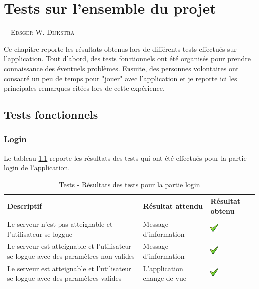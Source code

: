 

\chapter{Tests sur l'ensemble du projet}
\label{testensembleprojet}
\begin{epigraphs}
%
{---\textsc{Edsger W. Dijkstra}}
\end{epigraphs}

Ce chapitre reporte les résultats obtenus lors de différents tests effectués sur l'application. Tout d'abord, des tests fonctionnels ont été organisés pour prendre connaissance des éventuels problèmes. Ensuite, des personnes volontaires ont consacré un peu de temps pour "jouer" avec l'application et je reporte ici les principales remarques citées lors de cette expérience.

\section{Tests fonctionnels} %
\label{sec:tests_fonctionnels}

\subsection{Login} %
\label{sub:login}
Le tableau \ref{tab:testLogin} reporte les résultats des tests qui ont été effectués pour la partie login de l'application.
\begin{table}[H]
\begin{tabularx}{\textwidth}{|X|X|m{1.5cm}|}
  \hline
  \bf{Descriptif} & \bf{Résultat attendu} & \bf{Résultat obtenu} \\
  \hline
  Le serveur n'est pas atteignable et l'utilisateur se loggue & Message d'information & \includegraphics[width=16px]{00_media/ok.png} \\
  \hline
  Le serveur est atteignable et l'utilisateur se loggue avec des paramètres non valides & Message d'information & \includegraphics[width=16px]{00_media/ok.png} \\
  \hline
    Le serveur est atteignable et l'utilisateur se loggue avec des paramètres valides & L'application change de vue & \includegraphics[width=16px]{00_media/ok.png} \\
  \hline
\end{tabularx}
\caption{Tests - Résultats des tests pour la partie login}
\label{tab:testLogin}
\end{table}

